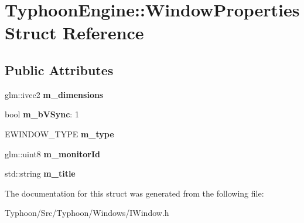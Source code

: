 \hypertarget{struct_typhoon_engine_1_1_window_properties}{}\section{Typhoon\+Engine\+::Window\+Properties Struct Reference}
\label{struct_typhoon_engine_1_1_window_properties}
\subsection*{Public Attributes}
\begin{DoxyCompactItemize}
\item 
\mbox{\label{struct_typhoon_engine_1_1_window_properties_ae44115973e09237d2337470638eb40fd}} 
glm\+::ivec2 {\bfseries m\+\_\+dimensions}
\item 
\mbox{\label{struct_typhoon_engine_1_1_window_properties_ae327a4bdd1f25fd981d690210f285541}} 
bool {\bfseries m\+\_\+b\+V\+Sync}\+: 1
\item 
\mbox{\label{struct_typhoon_engine_1_1_window_properties_abc7e4f2c597b2fe2812e4514c36004d8}} 
E\+W\+I\+N\+D\+O\+W\+\_\+\+T\+Y\+PE {\bfseries m\+\_\+type}
\item 
\mbox{\label{struct_typhoon_engine_1_1_window_properties_abf30066550006bf95ace8f443f2fd2d0}} 
glm\+::uint8 {\bfseries m\+\_\+monitor\+Id}
\item 
\mbox{\label{struct_typhoon_engine_1_1_window_properties_a90fa4292035f9d8692b08bf5af213bad}} 
std\+::string {\bfseries m\+\_\+title}
\end{DoxyCompactItemize}


The documentation for this struct was generated from the following file\+:\begin{DoxyCompactItemize}
\item 
Typhoon/\+Src/\+Typhoon/\+Windows/I\+Window.\+h\end{DoxyCompactItemize}
